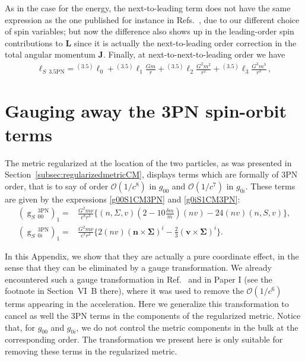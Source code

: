 \documentclass[
superscriptaddress,
preprint,
prd,tightenlines,showpacs,nofootinbib,
eqsecnum,
amsfonts,amsmath,amssymb]{revtex4-1}
\begin{document}
%
As in the case for the energy, the next-to-leading term does not have
the same expression as the one published for instance in
Refs.~\cite{Kidder1995,Faye2006}, due to our different choice of spin
variables; but now the difference also shows up in the leading-order
spin contributions to $\mathbf{L}$ since it is actually the
next-to-leading order correction in the total angular momentum
$\mathbf{J}$. Finally, at next-to-next-to-leading order we have
%
\begin{subequations}
\begin{align}
\mathop{\boldsymbol\ell}_{S}{}_{\!\mathrm{3.5PN}}=
{}^{(3.5)}\mathbf{\boldsymbol\ell}_0
+{}^{(3.5)}\mathbf{\boldsymbol\ell}_1 \frac{G m}{r}
+{}^{(3.5)}\mathbf{\boldsymbol\ell}_2 \frac{G^2 m^2}{r^2}
+{}^{(3.5)}\mathbf{\boldsymbol\ell}_3 \frac{G^3 m^3}{r^3} \, ,
\end{align}

\end{subequations} 

\section{Gauging away the 3PN spin-orbit terms}
\label{3PNgauge}

The metric regularized at the location of the two particles, as was
presented in Section~\ref{subsec:regularizedmetricCM}, displays terms
which are formally of 3PN order, that is to say of order
$\mathcal{O}(1/c^{8})$ in $g_{00}$ and $\mathcal{O}(1/c^{7})$ in
$g_{0i}$. These terms are given by the expressions \eqref{g00S1CM3PN}
and \eqref{g0iS1CM3PN}:
\begin{align} \label{eq:gaugetermsing}
	\left(\mathop{g}_{S}{}^{\!\mathrm{3PN}}_{00}\right)_1=&
\frac{G^{2}m \nu}{c^{8}r^{3}}\bigg\{(n,\Sigma,v)\left(2 -10\frac{\delta m}{m}\right) (nv)- 24 (nv)(n,S,v)\bigg\},\\
	\left(\mathop{g}_{S}{}^{\!\mathrm{3PN}}_{0i}\right)_1=&
\frac{G^{2}m\nu}{c^{7}r^{3}}\bigg\{2 (nv) (\mathbf{n} \times \mathbf{\Sigma} )^{i} - \frac{2}{3}(\mathbf{v} \times \mathbf{\Sigma})^{i}\bigg\}.
\end{align}

In this Appendix, we show that they are actually a pure coordinate
effect, in the sense that they can be eliminated by a gauge
transformation. We already encountered such a gauge transformation in Ref.~\cite{Blanchet2011} and in
Paper I (see the footnote in Section~VI~B there), where it was used to
remove the $\mathcal{O}(1/c^{6})$ terms appearing in the
acceleration. Here we generalize this transformation to cancel as well
the 3PN terms in the components of the regularized metric. Notice
that, for $g_{00}$ and $g_{0i}$, we do not control the metric
components in the bulk at the corresponding order. The transformation
we present here is only suitable for removing these terms in the
regularized metric.
\end{document}
